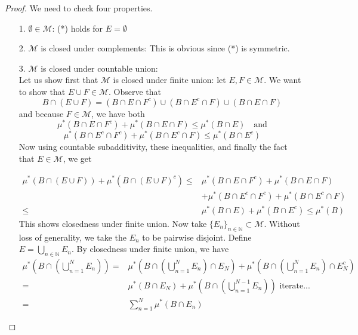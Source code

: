 \documentclass[11pt]{scrartcl}
\begin{document}
\begin{proof}
We need to check four properties. \\
\begin{itemize}
\item[1.] $\emptyset \in \mathcal{M}$: (*) holds for $E = \emptyset$ \\
\item[2.] $\mathcal{M}$ is closed under complements: This is obvious since (*) is symmetric.\\
\item[3.] $\mathcal{M}$ is closed under countable union: \\ 
Let us show first that $\mathcal{M}$ is closed under finite union: let $E,F \in \mathcal{M}$. We want to show that $E \cup F \in \mathcal{M}$. Observe that 
$$ B\cap (E \cup F) = (B\cap E \cap F^c) \cup (B\cap E^c \cap F) \cup (B\cap E \cap F)$$ and because $F\in \mathcal{M}$, we have both
$$\mu^*(B\cap E \cap F^c) + \mu^*(B\cap E \cap F) \leq \mu^*(B\cap E) \quad \text{and}$$
$$\mu^*(B\cap E^c \cap F^c) + \mu^*(B\cap E^c \cap F) \leq \mu^*(B\cap E^c)$$
Now using countable subadditivity, these inequalities, and finally the fact that $E \in \mathcal{M}$, we get

\begin{align*}
\mu^*(B\cap (E \cup F)) + \mu^*(B\cap (E \cup F)^c) {} \leq & \mu^*(B\cap E \cap F^c) + \mu^*(B\cap E \cap F)\\
& + \mu^*(B\cap E^c \cap F^c) + \mu^*(B\cap E^c \cap F) \\
\leq & \mu^*(B\cap E) + \mu^*(B\cap E^c) \leq \mu^*(B) 
\end{align*}
This shows closedness under finite union.
Now take $\{E_n\}_{n\in \mathbb{N}}\subset \mathcal{M}$. Without loss of generality, we take the $E_n$ to be pairwise disjoint. Define $ E  = \bigcup_{n\in \mathbb{N}} E_n$. By closedness under finite union, we have 
\begin{align*}
\mu^*(B\cap (\bigcup_{n=1}^N E_n)) = & \mu^*(B\cap (\bigcup_{n=1}^N E_n) \cap E_N) + \mu^*(B\cap (\bigcup_{n=1}^N E_n) \cap E_N^c) \\
 = & \mu^*(B \cap E_N) + \mu^*(B\cap (\bigcup_{n=1}^{N-1} E_n)) \text{  iterate...}\\
 =  & \sum_{n=1}^N \mu^*(B \cap E_n)
\end{align*}


\end{itemize}
\end{proof}
\end{document}
